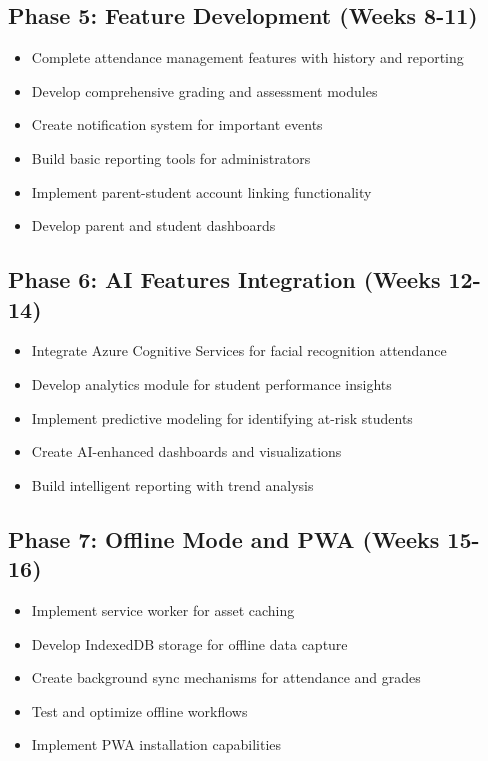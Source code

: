 \documentclass[11pt]{report}
\begin{document}
\subsection{Phase 5: Feature Development (Weeks 8-11)}
\begin{itemize}
    \item Complete attendance management features with history and reporting
    \item Develop comprehensive grading and assessment modules
    \item Create notification system for important events
    \item Build basic reporting tools for administrators
    \item Implement parent-student account linking functionality
    \item Develop parent and student dashboards
\end{itemize}

\subsection{Phase 6: AI Features Integration (Weeks 12-14)}
\begin{itemize}
    \item Integrate Azure Cognitive Services for facial recognition attendance
    \item Develop analytics module for student performance insights
    \item Implement predictive modeling for identifying at-risk students
    \item Create AI-enhanced dashboards and visualizations
    \item Build intelligent reporting with trend analysis
\end{itemize}

\subsection{Phase 7: Offline Mode and PWA (Weeks 15-16)}
\begin{itemize}
    \item Implement service worker for asset caching
    \item Develop IndexedDB storage for offline data capture
    \item Create background sync mechanisms for attendance and grades
    \item Test and optimize offline workflows
    \item Implement PWA installation capabilities
\end{itemize}
\end{document}
